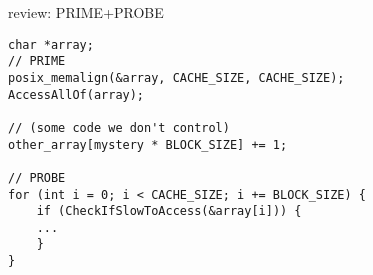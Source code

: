 
\begin{frame}[fragile]{review: PRIME+PROBE}
\begin{Verbatim}[fontsize=\small]
char *array;
// PRIME
posix_memalign(&array, CACHE_SIZE, CACHE_SIZE);
AccessAllOf(array);

// (some code we don't control)
other_array[mystery * BLOCK_SIZE] += 1;

// PROBE
for (int i = 0; i < CACHE_SIZE; i += BLOCK_SIZE) {
    if (CheckIfSlowToAccess(&array[i])) {
    ...
    }
}
\end{Verbatim}
\end{frame}
